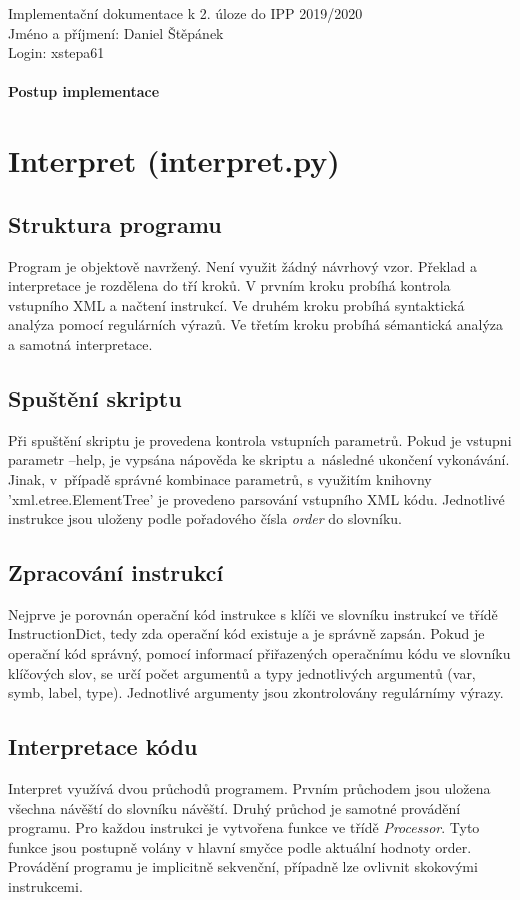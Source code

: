 \documentclass[a4paper, 10pt]{article}
\begin{document}
\hspace{-5mm}Implementační dokumentace k 2. úloze do IPP 2019/2020\\
Jméno a příjmení: Daniel Štěpánek\\
Login: xstepa61\\
\\
\textbf{\Large{Postup implementace}}

\section{Interpret (interpret.py)}

\subsection{Struktura programu}
\qquad Program je objektově navržený. Není využit žádný návrhový vzor. Překlad a interpretace je rozdělena do tří kroků. V prvním kroku probíhá kontrola vstupního XML a načtení instrukcí. Ve druhém kroku probíhá syntaktická analýza pomocí regulárních výrazů. Ve třetím kroku probíhá sémantická analýza a samotná interpretace.

\subsection{Spuštění skriptu}
\qquad Při spuštění skriptu je provedena kontrola vstupních parametrů. Pokud je vstupni parametr  --help, je vypsána nápověda ke skriptu a~následné ukončení vykonávání. Jinak, v~případě správné kombinace parametrů, s využitím knihovny 'xml.etree.ElementTree' je provedeno parsování vstupního XML kódu. Jednotlivé instrukce jsou uloženy podle pořadového čísla \emph{order} do slovníku. 
	
\subsection{Zpracování instrukcí}
\qquad Nejprve je porovnán operační kód instrukce s klíči ve slovníku instrukcí ve třídě InstructionDict, tedy zda operační kód existuje a je správně zapsán. Pokud je operační kód správný, pomocí informací přiřazených operačnímu kódu ve slovníku klíčových slov, se určí počet argumentů a typy jednotlivých argumentů (var, symb, label, type). Jednotlivé argumenty jsou zkontrolovány regulárnímy výrazy. 

\subsection{Interpretace kódu}
\qquad Interpret využívá dvou průchodů programem. Prvním průchodem jsou uložena všechna návěští do slovníku návěští. Druhý průchod je samotné provádění programu. Pro každou instrukci je vytvořena funkce ve třídě \emph{Processor}. Tyto funkce jsou postupně volány v hlavní smyčce podle aktuální hodnoty order. Provádění programu je implicitně sekvenční, případně lze ovlivnit skokovými instrukcemi. 
\end{document}
